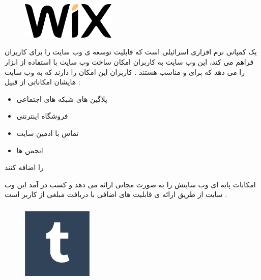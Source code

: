 \documentclass[12pt]{book}
\begin{document}
\newpage

\subsubsection{}

\begin{figure}
  \vspace{60pt}
  \begin{center}
    \includegraphics[width=0.4\textwidth]{./640px-Wix.com_website_logo.svg.png}
  \end{center}
  \vspace{-20pt}
  \caption{}
  \vspace{-10pt}
\end{figure}

یک کمپانی نرم افزاری اسرائیلی است که قابلیت توسعه ی وب سایت را برای کاربران فراهم می کند،  این وب سایت به کاربران امکان ساخت وب سایت با استفاده از ابزار
را می دهد که برای 
و
مناسب هستند .
کاربران این امکان را دارند که به وب سایت هایشان امکاناتی از قبیل :
\begin{itemize}
	\item پلاگین های شبکه های اجتماعی
	\item فروشگاه اینترنتی
	\item تماس با ادمین سایت
	\item انجمن ها
\end{itemize}

را اضافه کنند

امکانات پایه ای وب سایتش را به صورت مجانی ارائه می دهد و کسب در آمد این وب سایت از طریق ارائه ی قابلیت های اضافی با دریافت مبلغی از کاربر است .



\subsubsection{}


\begin{figure}
  \vspace{100pt}
  \begin{center}
    \includegraphics[width=0.3\textwidth]{./Tumblr.svg.png}
  \end{center}
  \vspace{-20pt}
  \caption{}
  \vspace{-10pt}
\end{figure}
\end{document}
